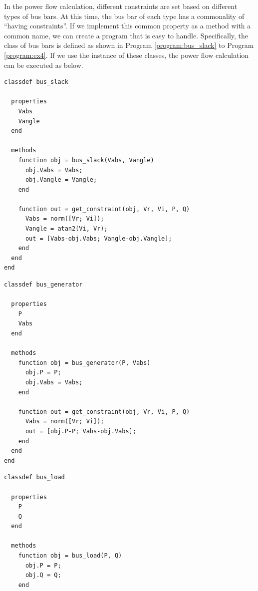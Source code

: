 \documentclass[graybox, envcountchap]{svmult}
\begin{document}
\begin{example}
In the power flow calculation, different constraints are set based on different types of bus bars.
At this time, the bus bar of each type has a commonality of “having constraints”.
If we implement this common property as a method with a common name, we can create a program that is easy to handle.
Specifically, the class of bus bars is defined as shown in Program \ref{program:bus_slack} to Program \ref{program:ex4}.
If we use the instance of these classes, the power flow calculation can be executed as below.

\smallskip
\begin{PROGRAMA}[count,title={bus\_slack.m}]\label{program:bus_slack}
\begin{verbatim}
classdef bus_slack
  
  properties
    Vabs
    Vangle
  end
  
  methods
    function obj = bus_slack(Vabs, Vangle)
      obj.Vabs = Vabs;
      obj.Vangle = Vangle;
    end
    
    function out = get_constraint(obj, Vr, Vi, P, Q)
      Vabs = norm([Vr; Vi]);
      Vangle = atan2(Vi, Vr);
      out = [Vabs-obj.Vabs; Vangle-obj.Vangle];
    end
  end
end
\end{verbatim}
\end{PROGRAMA}

\smallskip
\begin{PROGRAMA}[count,title={bus\_genertor.m}]\label{program:bus_PV}
\begin{verbatim}
classdef bus_generator
  
  properties
    P
    Vabs
  end
  
  methods
    function obj = bus_generator(P, Vabs)
      obj.P = P;
      obj.Vabs = Vabs;
    end
    
    function out = get_constraint(obj, Vr, Vi, P, Q)
      Vabs = norm([Vr; Vi]);
      out = [obj.P-P; Vabs-obj.Vabs];
    end
  end
end
\end{verbatim}
\end{PROGRAMA}

\smallskip
\begin{PROGRAMA}[count,title={bus\_load.m}]\label{program:bus_PQ}
\begin{verbatim}
classdef bus_load
  
  properties
    P
    Q
  end
  
  methods
    function obj = bus_load(P, Q)
      obj.P = P;
      obj.Q = Q;
    end
    

\end{verbatim}
\end{PROGRAMA}
\end{example}
\end{document}
